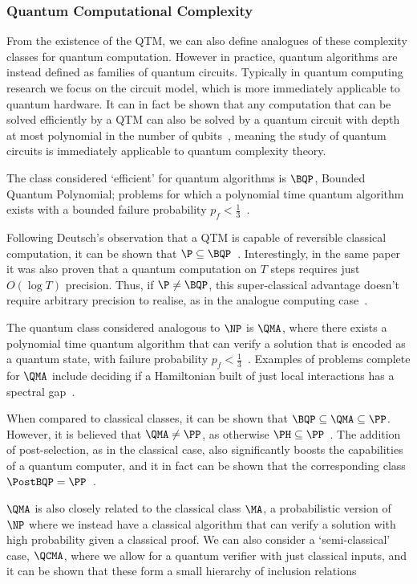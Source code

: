 \subsubsection{Quantum Computational Complexity}
From the existence of the QTM, we can also define analogues of these complexity classes for quantum computation. However in practice, quantum algorithms are instead defined as families of quantum circuits. Typically in quantum computing research we focus on the circuit model, which is more immediately applicable to quantum hardware. It can in fact be shown that any computation that can be solved efficiently by a QTM can also be solved by a quantum circuit with depth at most polynomial in the number of qubits~\cite{Yao1993}, meaning the study of quantum circuits is immediately applicable to quantum complexity theory.\par 
The class considered `efficient' for quantum algorithms is $\BQP$, Bounded Quantum Polynomial; problems for which a polynomial time quantum algorithm exists with a bounded failure probability $p_{f}<\frac{1}{3}$~\cite{Nielsen2000}.
\par
Following Deutsch's observation that a QTM is capable of reversible classical computation, it can be shown that $\P\subseteq \BQP$~\cite{Bernstein1997}. Interestingly, in the same paper it was also proven that a quantum computation on $T$ steps requires just $O\left(\log{T}\right)$ precision. Thus, if $\P\neq \BQP$, this super-classical advantage doesn't require arbitrary precision to realise, as in the analogue computing case~\cite{Bernstein1997}.\par
The quantum class considered analogous to $\NP$ is $\QMA$, where there exists a polynomial time quantum algorithm that can verify a solution that is encoded as a quantum state, with failure probability $p_{f}<\frac{1}{3}$~\cite{Watrous2008}. Examples of problems complete for $\QMA$ include deciding if a Hamiltonian built of just local interactions has a spectral gap~\cite{Kempe2004}.\par
When compared to classical classes, it can be shown that $\BQP\subseteq \QMA\subseteq \PP$. However, it is believed that $\QMA\neq \PP$, as otherwise $\PH\subseteq \PP$~\cite{Vyalyi03}. The addition of post-selection, as in the classical case, also significantly boosts the capabilities of a quantum computer, and it in fact can be shown that the corresponding class $\PostBQP=\PP$~\cite{Aaronson2004c}.\par
$\QMA$ is also closely related to the classical class $\MA$, a probabilistic version of $\NP$ where we instead have a classical algorithm that can verify a solution with high probability given a classical proof. We can also consider a `semi-classical' case, $\QCMA$, where we allow for a quantum verifier with just classical inputs, and it can be shown that these form a small hierarchy of inclusion relations~\cite{Aharonov2002}
